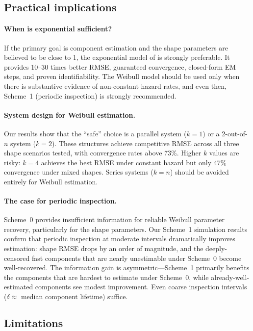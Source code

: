 \documentclass[12pt]{article}
\theoremstyle{definition}
\theoremstyle{remark}
\begin{document}
\subsection{Practical implications}

\paragraph{When is exponential sufficient?}
If the primary goal is component estimation and the shape
parameters are believed to be close to 1, the exponential model of
\citet{Towell2026} is strongly preferable.  It provides
10--30 times better RMSE, guaranteed convergence, closed-form EM
steps, and proven identifiability.  The Weibull model should be
used only when there is substantive evidence of non-constant hazard
rates, and even then, Scheme~1 (periodic inspection) is strongly
recommended.

\paragraph{System design for Weibull estimation.}
Our results show that the ``safe'' choice is a parallel system
($k = 1$) or a 2-out-of-$n$ system ($k = 2$).  These structures
achieve competitive RMSE across all three shape scenarios tested,
with convergence rates above 73\%.  Higher $k$ values are risky:
$k = 4$ achieves the best RMSE under constant hazard but only 47\%
convergence under mixed shapes.  Series systems ($k = n$) should
be avoided entirely for Weibull estimation.

\paragraph{The case for periodic inspection.}
Scheme~0 provides insufficient information for reliable Weibull
parameter recovery, particularly for the shape parameters.  Our
Scheme~1 simulation results confirm that periodic inspection at
moderate intervals dramatically improves estimation: shape RMSE
drops by an order of magnitude, and the deeply-censored fast
components that are nearly unestimable under Scheme~0 become
well-recovered.  The information gain is asymmetric---Scheme~1
primarily benefits the components that are hardest to estimate
under Scheme~0, while already-well-estimated components see
modest improvement.  Even coarse inspection intervals
($\delta \approx$ median component lifetime) suffice.

\subsection{Limitations}
\end{document}
